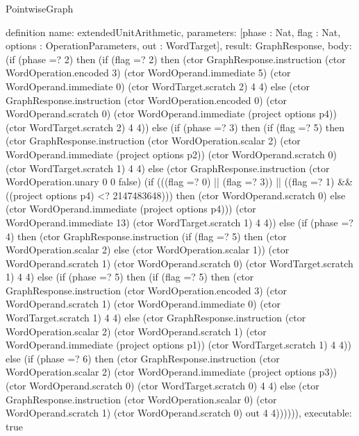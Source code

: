 \begin{lexlean}{PointwiseGraph}
\begin{semanticmodule}
definition{
  name: extendedUnitArithmetic,
  parameters: [phase : Nat, flag : Nat, options : OperationParameters, out : WordTarget],
  result: GraphResponse,
  body: (if (phase =? 2) then (if (flag =? 2) then (ctor GraphResponse.instruction (ctor WordOperation.encoded 3) (ctor WordOperand.immediate 5) (ctor WordOperand.immediate 0) (ctor WordTarget.scratch 2) 4 4) else (ctor GraphResponse.instruction (ctor WordOperation.encoded 0) (ctor WordOperand.scratch 0) (ctor WordOperand.immediate (project options p4)) (ctor WordTarget.scratch 2) 4 4)) else (if (phase =? 3) then (if (flag =? 5) then (ctor GraphResponse.instruction (ctor WordOperation.scalar 2) (ctor WordOperand.immediate (project options p2)) (ctor WordOperand.scratch 0) (ctor WordTarget.scratch 1) 4 4) else (ctor GraphResponse.instruction (ctor WordOperation.unary 0 0 false) (if (((flag =? 0) || (flag =? 3)) || ((flag =? 1) && ((project options p4) <? 2147483648))) then (ctor WordOperand.scratch 0) else (ctor WordOperand.immediate (project options p4))) (ctor WordOperand.immediate 13) (ctor WordTarget.scratch 1) 4 4)) else (if (phase =? 4) then (ctor GraphResponse.instruction (if (flag =? 5) then (ctor WordOperation.scalar 2) else (ctor WordOperation.scalar 1)) (ctor WordOperand.scratch 1) (ctor WordOperand.scratch 0) (ctor WordTarget.scratch 1) 4 4) else (if (phase =? 5) then (if (flag =? 5) then (ctor GraphResponse.instruction (ctor WordOperation.encoded 3) (ctor WordOperand.scratch 1) (ctor WordOperand.immediate 0) (ctor WordTarget.scratch 1) 4 4) else (ctor GraphResponse.instruction (ctor WordOperation.scalar 2) (ctor WordOperand.scratch 1) (ctor WordOperand.immediate (project options p1)) (ctor WordTarget.scratch 1) 4 4)) else (if (phase =? 6) then (ctor GraphResponse.instruction (ctor WordOperation.scalar 2) (ctor WordOperand.immediate (project options p3)) (ctor WordOperand.scratch 0) (ctor WordTarget.scratch 0) 4 4) else (ctor GraphResponse.instruction (ctor WordOperation.scalar 0) (ctor WordOperand.scratch 1) (ctor WordOperand.scratch 0) out 4 4)))))),
  executable: true
}


\end{semanticmodule}
\end{lexlean}
